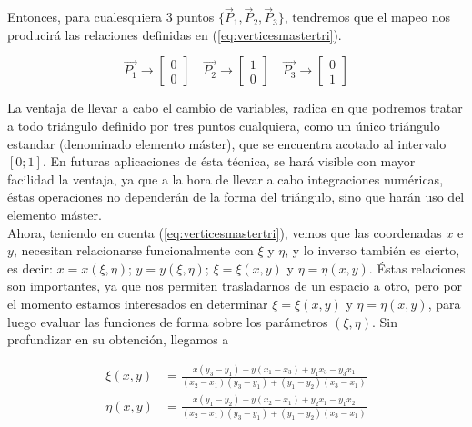  Entonces, para cualesquiera 3 puntos $ \lbrace \vec{P}_{1}, \vec{P}_{2}, \vec{P}_{3}  \rbrace $, tendremos que el mapeo nos producirá las relaciones definidas en (\ref{eq:verticesmastertri}).

\begin{equation}
  \label{eq:verticesmastertri}
  \vec{P_1} \rightarrow 
  \begin{bmatrix}
    0\\ 
    0
  \end{bmatrix}\quad \vec{P_2} \rightarrow
  \begin{bmatrix}
    1\\
    0
  \end{bmatrix}\quad \vec{P_3} \rightarrow
  \begin{bmatrix}
    0\\
    1
  \end{bmatrix}
\end{equation}

La ventaja de llevar a cabo el cambio de variables, radica en que podremos tratar a todo triángulo definido por tres puntos cualquiera, como un único triángulo estandar (denominado elemento máster), que se encuentra acotado al intervalo $ [0; 1] $. En futuras aplicaciones de ésta técnica, se hará visible con mayor facilidad la ventaja, ya que a la hora de llevar a cabo integraciones numéricas, éstas operaciones no dependerán de la forma del triángulo, sino que harán uso del elemento máster. 
\\
Ahora, teniendo en cuenta (\ref{eq:verticesmastertri}), vemos que las coordenadas $x$ e $y$, necesitan relacionarse funcionalmente con  $\xi$ y $\eta$, y lo inverso también es cierto, es decir: $x=x( \xi, \eta)$; $y=y( \xi, \eta)$; $\xi= \xi(x,y)$ y $\eta= \eta(x,y)$. Éstas relaciones son importantes, ya que nos permiten trasladarnos de un espacio a otro, pero por el momento estamos interesados en determinar $\xi= \xi(x,y)$ y $\eta= \eta(x,y)$, para luego evaluar las funciones de forma sobre los parámetros $(\xi, \eta)$. Sin profundizar en su obtención, llegamos a
 
\begin{equation}
  \label{eq:chietadexy}
  \begin{split}
    \xi(x,y) & =
    \frac{x(y_3-y_1)+y(x_1-x_3)+y_1x_3-y_3x_1}{(x_2-x_1)(y_3-y_1)+(y_1-y_2)(x_3-x_1)} \\
    \eta(x,y) & =
    \frac{x(y_1-y_2)+y(x_2-x_1)+y_2x_1-y_1x_2}{(x_2-x_1)(y_3-y_1)+(y_1-y_2)(x_3-x_1)}
  \end{split}
\end{equation}

